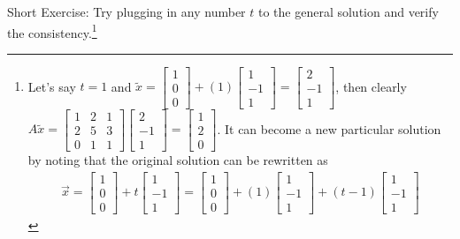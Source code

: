 Short Exercise: Try plugging in any number $t$ to the general solution and verify the consistency.\footnote{Let's say $t=1$ and $\tilde{x} = 
\begin{bmatrix}
1 \\
0 \\
0
\end{bmatrix}
+ (1)
\begin{bmatrix}
1 \\
-1 \\
1
\end{bmatrix}
=
\begin{bmatrix}
2 \\
-1 \\
1
\end{bmatrix}$, then clearly $A\tilde{x} = 
\begin{bmatrix}
1 & 2 & 1 \\
2 & 5 & 3 \\
0 & 1 & 1 
\end{bmatrix}
\begin{bmatrix}
2 \\
-1 \\
1
\end{bmatrix}
= 
\begin{bmatrix}
1 \\
2 \\
0
\end{bmatrix}$. It can become a new particular solution by noting that the original solution can be rewritten as
\begin{align*}
\vec{x} =
\begin{bmatrix}
1 \\
0 \\
0
\end{bmatrix}
+ t
\begin{bmatrix}
1 \\
-1 \\
1
\end{bmatrix}
= 
\begin{bmatrix}
1 \\
0 \\
0
\end{bmatrix}
+ (1)
\begin{bmatrix}
1 \\
-1 \\
1
\end{bmatrix}
+
(t-1)
\begin{bmatrix}
1 \\
-1 \\
1
\end{bmatrix}

\end{align*}}
